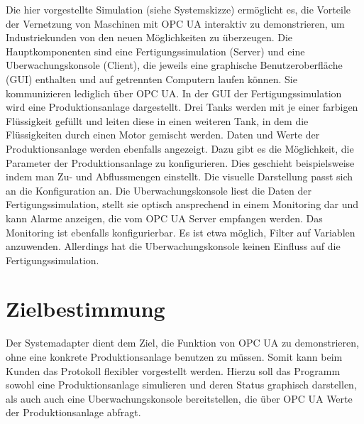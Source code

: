 \documentclass[parskip=full]{scrartcl}
\begin{document}
Die hier vorgestellte Simulation (siehe Systemskizze) ermöglicht es, die Vorteile der Vernetzung von Maschinen mit \gls{OPC UA} interaktiv zu demonstrieren, um Industriekunden von den neuen Möglichkeiten zu überzeugen.
Die Hauptkomponenten sind eine \gls{Fertigungssimulation} (Server) und eine \gls{Uberwachungskonsole} (Client),
die jeweils eine graphische Benutzeroberfläche (\gls{GUI}) enthalten und auf getrennten Computern laufen können.
Sie kommunizieren lediglich über \gls{OPC UA}.
In der GUI der \gls{Fertigungssimulation} wird eine \gls{Produktionsanlage} dargestellt.
Drei Tanks werden mit je einer farbigen Flüssigkeit gefüllt und leiten diese in einen weiteren Tank,
in dem die Flüssigkeiten durch einen Motor gemischt werden. Daten und Werte der \gls{Produktionsanlage} werden ebenfalls angezeigt. Dazu gibt es
die Möglichkeit, die Parameter der \gls{Produktionsanlage} zu konfigurieren. Dies geschieht beispielsweise indem man Zu- und Abflussmengen einstellt. Die visuelle Darstellung passt sich an die Konfiguration an.
Die \gls{Uberwachungskonsole} liest die Daten der \gls{Fertigungssimulation}, stellt sie optisch ansprechend in einem Monitoring dar
und kann Alarme anzeigen, die vom \gls{OPC UA Server} empfangen werden. Das Monitoring ist ebenfalls konfigurierbar. Es ist etwa möglich, Filter auf Variablen anzuwenden. Allerdings hat die \gls{Uberwachungskonsole} keinen Einfluss auf die \gls{Fertigungssimulation}.

\pagebreak
\section{Zielbestimmung}
Der \gls{Systemadapter} dient dem Ziel, die Funktion von \gls{OPC UA} zu demonstrieren, ohne eine konkrete \gls{Produktionsanlage}
benutzen zu müssen. Somit kann beim Kunden das Protokoll flexibler vorgestellt werden. Hierzu soll das Programm
sowohl eine \gls{Produktionsanlage} simulieren und deren Status graphisch darstellen, als auch auch eine \gls{Uberwachungskonsole}
bereitstellen, die über \gls{OPC UA} Werte der \gls{Produktionsanlage} abfragt.\\
\end{document}
